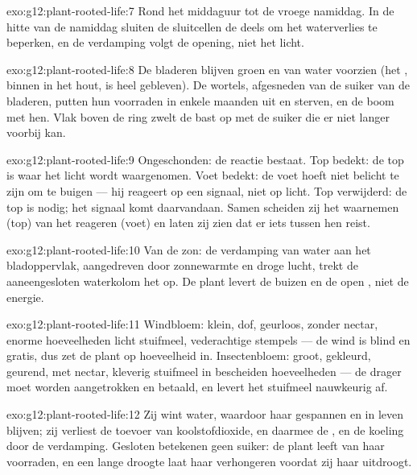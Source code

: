 \begin{solution}{exo:g12:plant-rooted-life:7}
Rond het middaguur tot de vroege namiddag. In de hitte van de namiddag
sluiten de sluitcellen de  deels om het waterverlies te
beperken, en de verdamping volgt de opening, niet het licht.
\end{solution}

\begin{solution}{exo:g12:plant-rooted-life:8}
De bladeren blijven groen en van water voorzien (het , binnen in
het hout, is heel gebleven). De wortels, afgesneden van de suiker van de
bladeren, putten hun voorraden in enkele maanden uit en sterven, en de
boom met hen. Vlak boven de ring zwelt de bast op met de suiker die er
niet langer voorbij kan.
\end{solution}

\begin{solution}{exo:g12:plant-rooted-life:9}
Ongeschonden: de reactie bestaat. Top bedekt: de top is waar het licht
wordt waargenomen. Voet bedekt: de voet hoeft niet belicht te zijn om te
buigen --- hij reageert op een signaal, niet op licht. Top verwijderd: de
top is nodig; het signaal komt daarvandaan. Samen scheiden zij het
waarnemen (top) van het reageren (voet) en laten zij zien dat er iets
tussen hen reist.
\end{solution}

\begin{solution}{exo:g12:plant-rooted-life:10}
Van de zon: de verdamping van water aan het bladoppervlak, aangedreven
door zonnewarmte en droge lucht, trekt de aaneengesloten waterkolom het
 op. De plant levert de buizen en de open , niet de
energie.
\end{solution}

\begin{solution}{exo:g12:plant-rooted-life:11}
Windbloem: klein, dof, geurloos, zonder nectar, enorme hoeveelheden licht
stuifmeel, vederachtige stempels --- de wind is blind en gratis, dus zet
de plant op hoeveelheid in. Insectenbloem: groot, gekleurd, geurend, met
nectar, kleverig stuifmeel in bescheiden hoeveelheden --- de drager moet
worden aangetrokken en betaald, en levert het stuifmeel nauwkeurig af.
\end{solution}

\begin{solution}{exo:g12:plant-rooted-life:12}
Zij wint water, waardoor haar  gespannen en in leven blijven; zij
verliest de toevoer van koolstofdioxide, en daarmee de , en de
koeling door de verdamping. Gesloten  betekenen geen suiker:
de plant leeft van haar voorraden, en een lange droogte laat haar
verhongeren voordat zij haar uitdroogt.
\end{solution}


